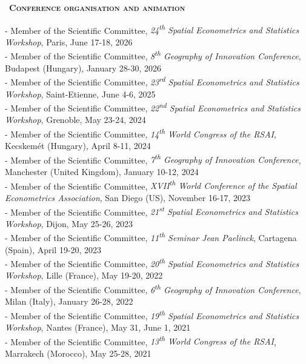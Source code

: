 \documentclass[a4paper,12pt]{article}
\newcommand{\smalltitre}[1]{%
	\noindent \textbullet~\textsc{\textbf{#1}}
	\smallskip
	}
\begin{document}

\smalltitre{Conference organisation and animation} \medskip

\noindent - Member of the Scientific Committee, \textit{24\textsuperscript{th} Spatial Econometrics and Statistics Workshop}, Paris, June 17-18, 2026\\ 
- Member of the Scientific Committee, \textit{8\textsuperscript{th} Geography of Innovation Conference}, Budapest (Hungary), January 28-30, 2026	 \\
- Member of the Scientific Committee, \textit{23\textsuperscript{rd} Spatial Econometrics and Statistics Workshop}, Saint-Etienne, June 4-6, 2025\\ 
- Member of the Scientific Committee, \textit{22\textsuperscript{nd} Spatial Econometrics and Statistics Workshop}, Grenoble, May 23-24, 2024\\ 
- Member of the Scientific Committee, \textit{14\textsuperscript{th} World Congress of the RSAI}, Kecskemét (Hungary), April 8-11, 2024 \\
- Member of the Scientific Committee, \textit{7\textsuperscript{th} Geography of Innovation Conference}, Manchester (United Kingdom), January 10-12, 2024 \\
-  Member of the Scientific Committee, \textit{XVII\textsuperscript{th} World Conference of the Spatial Econometrics Association}, San Diego (US), November 16-17, 2023 \\
- Member of the Scientific Committee, \textit{21\textsuperscript{st} Spatial Econometrics and Statistics Workshop}, Dijon, May 25-26, 2023\\ 
- Member of the Scientific Committee, \textit{11\textsuperscript{th} Seminar Jean Paelinck}, Cartagena (Spain), April 19-20, 2023\\ 
- Member of the Scientific Committee, \textit{20\textsuperscript{th} Spatial Econometrics and Statistics Workshop}, Lille (France), May 19-20, 2022 \\
- Member of the Scientific Committee, \textit{6\textsuperscript{th} Geography of Innovation Conference}, Milan (Italy), January 26-28, 2022 \\
 - Member of the Scientific Committee, \textit{19\textsuperscript{th} Spatial Econometrics and Statistics Workshop}, Nantes (France), May 31, June 1, 2021 \\
- Member of the Scientific Committee, \textit{13\textsuperscript{th} World Congress of the RSAI}, Marrakech (Morocco), May 25-28, 2021 \\
\end{document}
